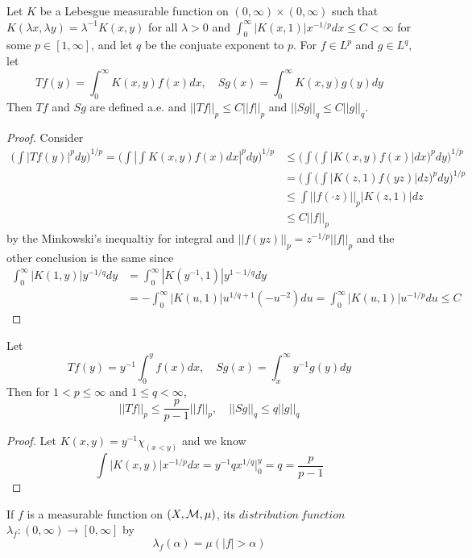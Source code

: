 \begin{theorem}
    Let $K$ be a Lebesgue measurable function on $(0,\infty)\times(0,\infty)$ such that $K(\lambda x,\lambda y) = \lambda^{-1}K(x,y)$ for all $\lambda > 0$ and $\int_0^{\infty}|K(x,1)|x^{-1/p}dx \leq C < \infty$ for some $p\in[1,\infty]$, and let $q$ be the conjuate exponent to $p$. For $f\in L^p$ and $g\in L^q$, let
    \[
    Tf(y) = \int_0^{\infty} K(x,y)f(x)dx,\quad Sg(x) = \int_0^{\infty} K(x,y)g(y)dy
    \]
    Then $Tf$ and $Sg$ are defined a.e. and $||Tf||_p \leq C||f||_p$ and $||Sg||_q \leq C||g||_q$.
\end{theorem}
\begin{proof}
    Consider
    \[
    \begin{aligned}
    \Big(\int |Tf(y)|^p dy\Big)^{1/p} = \Big(\int |\int K(x,y)f(x) dx|^p dy\big)^{1/p}
     &\leq \Big(\int \Big(\int |K(x,y)f(x)| dx\Big)^p dy\Big)^{1/p} \\
    &= \Big(\int \Big(\int |K(z,1)f(yz)| dz\Big)^p dy \Big)^{1/p}\\
    &\leq \int ||f(\cdot z)||_p |K(z,1)| dz \\
    &\leq C||f||_p
    \end{aligned}
    \]
    by the Minkowski's inequaltiy for integral and $||f(yz)||_p = z^{-1/p}||f||_p$ and the other conclusion is the same since
    \[
    \begin{aligned}
    \int_0^{\infty} |K(1,y)|y^{-1/q} dy &= \int_0^{\infty} |K(y^{-1},1)|y^{1-1/q}dy \\ &= - \int_0^{\infty}|K(u,1)|u^{1/q+1}(-u^{-2}) du = \int_0^{\infty} |K(u,1)| u^{-1/p} du \leq C
    \end{aligned}
    \]
\end{proof}

\begin{corollary}
    Let
    \[Tf(y) = y^{-1}\int_0^y f(x)dx,\quad Sg(x) = \int_x^{\infty} y^{-1}g(y)dy\]
    Then for $1<p\leq \infty$ and $1\leq q <\infty$,
    \[||Tf||_p \leq \dfrac{p}{p-1}||f||_p, \quad ||Sg||_q \leq q||g||_q\]
\end{corollary}
\begin{proof}\par
    Let $K(x,y) = y^{-1}\chi_{(x<y)}$ and we know
    \[\int |K(x,y)|x^{-1/p} dx = y^{-1} qx^{1/q}|^y_0 = q = \dfrac{p}{p-1}\]
\end{proof}

\begin{definition}
    If $f$ is a measurable function on $(X,\mathcal{M},\mu)$, its $distribution\ function$ $\lambda_f:(0,\infty)\to[0,\infty]$ by
    \[\lambda_f(\alpha) = \mu(|f|>\alpha)\]
\end{definition}

